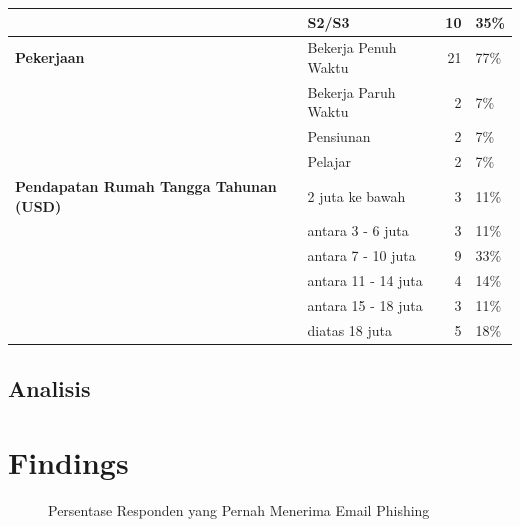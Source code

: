 \documentclass[lettersize,journal]{IEEEtran}
\begin{document}
\begin{table}[h!]
\begin{tabular}{@{}llrl@{}}
                                                   & S2/S3                & 10         & 35\%        \\ \midrule
    \textbf{Pekerjaan}                             & Bekerja Penuh Waktu  & 21         & 77\%        \\
                                                   & Bekerja Paruh Waktu  & 2          & 7\%         \\
                                                   & Pensiunan            & 2          & 7\%         \\
                                                   & Pelajar              & 2          & 7\%         \\ \midrule
    \textbf{Pendapatan Rumah Tangga Tahunan (USD)} & 2 juta ke bawah      & 3          & 11\%        \\
                                                   & antara 3 - 6 juta    & 3          & 11\%        \\
                                                   & antara 7 - 10 juta   & 9          & 33\%        \\
                                                   & antara 11 - 14 juta  & 4          & 14\%        \\
                                                   & antara 15 - 18 juta  & 3          & 11\%        \\
                                                   & diatas 18 juta       & 5          & 18\%        \\ \bottomrule
  \end{tabular}
\end{table}

\subsection{Analisis}

\section{Findings}

\begin{figure}[h]
  \centering
  \caption{Persentase Responden yang Pernah Menerima Email Phishing}
  \label{fig:phishing_experience}
\end{figure}
\end{document}
